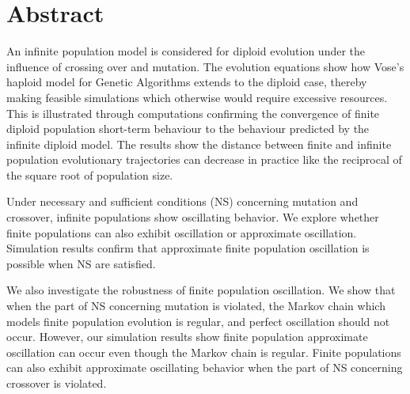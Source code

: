 \chapter*{Abstract}\label{ch:abstract}
An infinite population model is considered for diploid evolution under the influence of crossing over
and mutation. The evolution equations show how Vose's 
haploid model for Genetic Algorithms extends to the diploid case, thereby making feasible simulations
which otherwise would require excessive resources. This is illustrated through computations confirming
the convergence of finite diploid population short-term behaviour to the behaviour predicted by the
infinite diploid model. The results show the distance between finite and infinite population evolutionary trajectories can 
decrease in practice like the reciprocal of the square root of population size. 

Under necessary and sufficient conditions (NS) concerning mutation and crossover, 
infinite populations show oscillating behavior. 
We explore whether finite populations can also exhibit oscillation or approximate oscillation. 
Simulation results confirm that approximate finite population oscillation is possible when NS are satisfied. 

We also investigate the robustness of finite population oscillation.  
We show that when the part of NS concerning mutation is violated, 
the Markov chain which models finite population evolution is regular, 
and perfect oscillation  should not occur.
However, our simulation results show finite population 
approximate oscillation can occur even though the Markov chain is regular. 
Finite populations can also exhibit approximate oscillating behavior when the part of NS concerning crossover is violated. 



